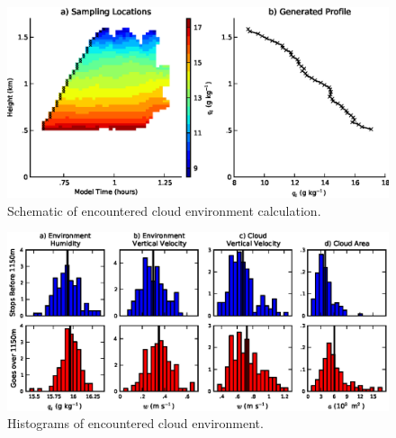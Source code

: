 \documentclass[acp]{copernicus}
\begin{document}
\begin{figure}[t]
\vspace*{2mm}
\begin{center}
\includegraphics[width=\textwidth]{./figures/cloud_environment_schematic}
\end{center}
\caption{Schematic of encountered cloud environment calculation.}
\label{fig:cloud_environment_schematic}
\end{figure}

\begin{figure}[t]
\vspace*{2mm}
\begin{center}
\includegraphics[width=\textwidth]{./figures/cloud_environment_histograms}
\end{center}
\caption{Histograms of encountered cloud environment.}
\label{fig:cloud_environment_histograms}
\end{figure}
\end{document}
